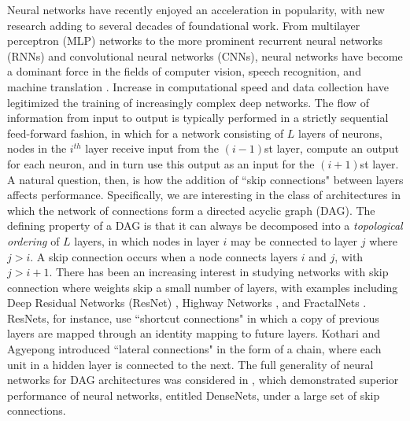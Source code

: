 \documentclass{jcmlatex}
\begin{document}
Neural networks have recently enjoyed an acceleration in popularity, with new research adding to several decades of foundational work. From multilayer perceptron (MLP) networks to the more prominent recurrent neural networks (RNNs) and convolutional neural networks (CNNs), neural networks have become a dominant force in the fields of computer vision, speech recognition, and machine translation \cite{rosenblatt1961principles}. Increase in computational speed and data collection have legitimized the training of increasingly complex deep networks. The flow of information from input to output is typically performed in a strictly sequential feed-forward fashion, in which for a network consisting of   $L$ layers of neurons,  nodes in the $i^{th}$ layer receive input from the $(i-1)$st layer, compute an output for each neuron, and in turn use this output as an input for the $(i+1)$st  layer. A natural question, then, is how the addition of ``skip connections" between layers affects performance.  Specifically, we are interesting in the class of architectures in which the network of connections form a directed acyclic graph (DAG).  The defining property of a DAG is that it can always be decomposed into a \textit{topological ordering} of $L$ layers, in which nodes in layer $i$ may be connected to layer $j$ where $j>i$.  A skip connection occurs when a node connects layers $i$ and $j$, with $j>i+1$.
There has been an increasing interest in studying networks with skip connection where weights skip a small number of layers, with examples including Deep Residual Networks (ResNet) \cite{he2016deep},  Highway Networks \cite{srivastava2015training}, and FractalNets \cite{larsson2016fractalnet}.  ResNets, for instance,  use ``shortcut connections" in which a copy of previous layers are mapped through an identity mapping to future layers. Kothari and Agyepong \cite{kothari1996lateral} introduced  ``lateral connections" in the form of a chain, where each unit in a hidden layer is connected to the next. %
The full generality of neural networks for DAG architectures was considered in \cite{huang2016densely}, which demonstrated superior performance of neural networks, entitled DenseNets, under a large set of skip connections.
\end{document}
